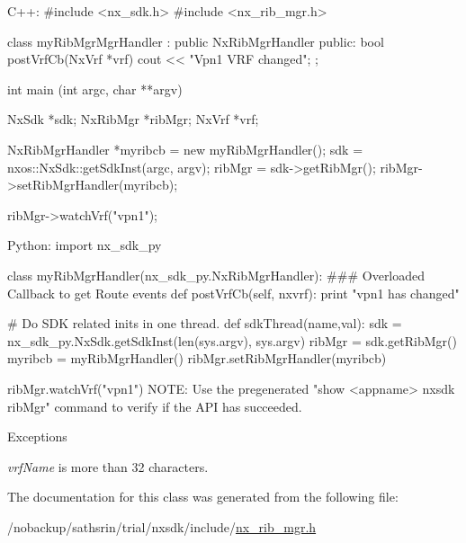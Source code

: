 \begin{DoxyCode}
  C++:
       #include <nx_sdk.h>
       #include <nx_rib_mgr.h>

       class myRibMgrMgrHandler : public NxRibMgrHandler {
          public:
             bool postVrfCb(NxVrf *vrf) {
                  cout << "Vpn1 VRF changed";
             }
       };

       int  main (int argc, char **argv)
       { 
            NxSdk    *sdk;
            NxRibMgr *ribMgr;
            NxVrf    *vrf;

            NxRibMgrHandler *myribcb = new myRibMgrHandler();
            sdk = nxos::NxSdk::getSdkInst(argc, argv);
            ribMgr = sdk->getRibMgr();
            ribMgr->setRibMgrHandler(myribcb);

            ribMgr->watchVrf("vpn1");
       }

  Python:
     import nx_sdk_py

     class myRibMgrHandler(nx_sdk_py.NxRibMgrHandler):
     ### Overloaded Callback to get Route events
           def postVrfCb(self, nxvrf):
               print "vpn1 has changed"

     # Do SDK related inits in one thread.
     def sdkThread(name,val):
         sdk = nx_sdk_py.NxSdk.getSdkInst(len(sys.argv), sys.argv)
         ribMgr = sdk.getRibMgr()
         myribcb = myRibMgrHandler()
         ribMgr.setRibMgrHandler(myribcb)

         ribMgr.watchVrf("vpn1")
 NOTE: Use the pregenerated "show <appname> nxsdk ribMgr" command
       to verify if the API has succeeded.
\end{DoxyCode}



\begin{DoxyExceptions}{Exceptions}
\item[{\em vrfName}]is more than 32 characters. \end{DoxyExceptions}


The documentation for this class was generated from the following file:\begin{DoxyCompactItemize}
\item 
/nobackup/sathsrin/trial/nxsdk/include/\hyperlink{nx__rib__mgr_8h}{nx\_\-rib\_\-mgr.h}\end{DoxyCompactItemize}
